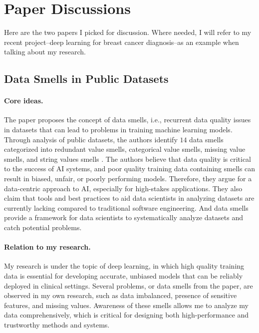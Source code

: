 \documentclass[11pt]{article}
\begin{document}
\section{Paper Discussions}

Here are the two papers I picked for discussion. 
Where needed, I will refer to my recent project--deep learning for breast cancer diagnosis--as an example when talking about my research.

\subsection{Data Smells in Public Datasets \cite{shome2022data}}

\paragraph{Core ideas.}
The paper proposes the concept of data smells, i.e., recurrent data quality issues in datasets that can lead to problems in training machine learning models. 
Through analysis of public datasets, the authors identify $14$ data smells categorized into redundant value smells, categorical value smells, missing value smells, and string values smells \cite{shome2022data}.
The authors believe that data quality is critical to the success of AI systems, and poor quality training data containing smells can result in biased, unfair, or poorly performing models. 
Therefore, they argue for a data-centric approach to AI, especially for high-stakes applications. 
They also claim that tools and best practices to aid data scientists in analyzing datasets are currently lacking compared to traditional software engineering. 
And data smells provide a framework for data scientists to systematically analyze datasets and catch potential problems.

\paragraph{Relation to my research.}
My research is under the topic of deep learning, in which high quality training data is essential for developing accurate, unbiased models that can be reliably deployed in clinical settings.
Several problems, or data smells from the paper, are observed in my own research, such as data imbalanced, presence of sensitive features, and missing values.
Awareness of these smells allows me to analyze my data comprehensively, which is critical for designing both high-performance and trustworthy methods and systems.
\end{document}

